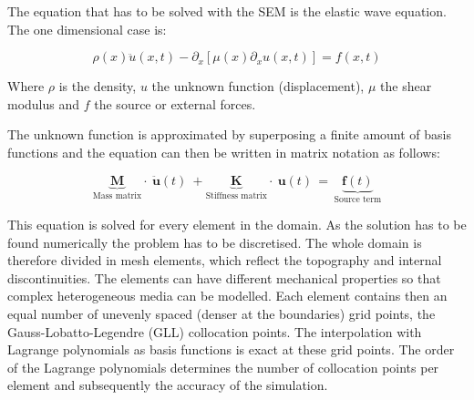 
The equation that has to be solved with the SEM is the elastic wave equation. The one dimensional case is: 

\begin{equation}\label{1Dwave}
\rho(x) \ddot{u}(x,t) -  \partial_x \left[ \mu(x) \partial_x u(x,t) \right] = f(x,t)
\end{equation}

Where $\rho$ is the density, $u$ the unknown function (displacement), $\mu$ the shear modulus and $f$ the source or external forces.

The unknown function is approximated by superposing a finite amount of basis functions and the equation can then be written in matrix 
notation as follows: 

\begin{equation}\label{matrix_equation}
\underbrace{\textbf{M}}_{\text{Mass matrix}} \cdot \ \ddot{\textbf {u}} (t)  \ + \underbrace{\textbf{K}}_{\text{Stiffness matrix}} \cdot \ \textbf{u} (t) \, = \, \underbrace{\textbf{f} (t)}_{\text{Source term}} 
\end{equation}

%

This equation is solved for every element in the domain. 
As the solution has to be found numerically the problem has to be discretised. 
The whole domain is therefore divided in mesh elements, which reflect the topography and internal discontinuities.
The elements can have different mechanical properties so that complex heterogeneous media can be modelled. 
Each element contains then an equal number of unevenly spaced (denser at the boundaries) grid points, the 
Gauss-Lobatto-Legendre (GLL) collocation points.
The interpolation with Lagrange polynomials as basis functions is exact at these grid points. 
The order of the Lagrange polynomials determines the number of collocation points per element and subsequently the accuracy of the simulation. 

